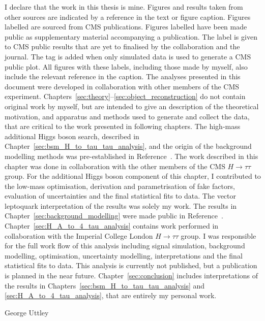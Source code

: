 \begin{titlepage}
\begin{adjustwidth}{1cm}{1cm}
I declare that the work in this thesis is mine. 
Figures and results taken from other sources are indicated by a reference in the text or figure caption. 
Figures labelled  are sourced from CMS publications. 
Figures labelled  have been made public as supplementary material accompanying a publication. 
The  label is given to CMS public results that are yet to finalised by the collaboration and the journal.
The  tag is added when only simulated data is used to generate a CMS public plot.
All figures with these labels, including those made by myself, also include the relevant reference in the caption.
The analyses presented in this document were developed in collaboration with other members of the CMS experiment. 
Chapters~\ref{sec:theory}--\ref{sec:object_reconstruction} do not contain original work by myself, but are intended to give an description of the theoretical motivation, and apparatus and methods used to generate and collect the data, that are critical to the work presented in following chapters. 
The high-mass additional Higgs boson search, described in Chapter~\ref{sec:bsm_H_to_tau_tau_analysis}, and the origin of the background modelling methods was pre-established in Reference~\cite{CMS_MSSM_Tau_2018}.
The work described in this chapter was done in collaboration with the other members of the CMS $H\rightarrow\tau\tau$ group.
For the additional Higgs boson component of this chapter, I contributed to the low-mass optimisation, derivation and parametrisation of fake factors, evaluation of uncertainties and the final statistical fits to data.
The vector leptoquark interpretation of the results was solely my work.
The results in Chapter~\ref{sec:background_modelling} were made public in Reference~\cite{CMS:2022rbd}.
Chapter~\ref{sec:H_A_to_4_tau_analysis} contains work performed in collaboration with the Imperial College London $H\rightarrow\tau\tau$ group.
I was responsible for the full work flow of this analysis including signal simulation, background modelling, optimisation, uncertainty modelling, interpretations and the final statistical fits to data.
This analysis is currently not published, but a publication is planned in the near future.
Chapter~\ref{sec:conclusion} includes interpretations of the results in Chapters~\ref{sec:bsm_H_to_tau_tau_analysis} and \ref{sec:H_A_to_4_tau_analysis}, that are entirely my personal work.

\begin{FlushRight}
George Uttley
\end{FlushRight}
\end{adjustwidth}
\vspace*{\fill}


\end{titlepage}
